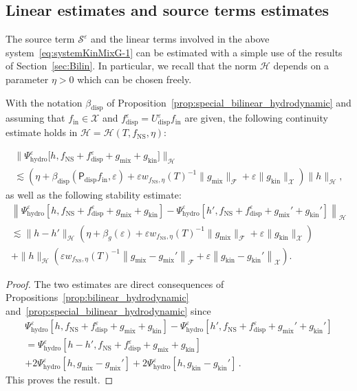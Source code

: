 \documentclass[10pt]{amsart}
\theoremstyle{definition}\newtheorem{defi}[theo]{Definition}\newtheorem{rema}[theo]{Remark}\newtheorem{exam}[theo]{Example}\newtheorem{exem}[theo]{Example}\newtheorem{nota}[theo]{Notation}
\newcommand{\ini}{\mathrm{in}}
\newcommand{\ns}{\mathrm{NS}}
\newcommand{\hyd}{\mathrm{hydro}}
\newcommand{\mix}{\mathrm{mix}}
\newcommand{\kin}{\mathrm{kin}}
\newcommand{\disp}{\mathrm{disp}}
\newcommand{\XX}{\mathcal{X}}
\newcommand{\PP}{\mathsf{P}}
\renewcommand{\SS}{\mathcal{S}}
\newcommand{\FFF}{\mathscr{F}}
\newcommand{\HHH}{\mathscr{H}}
\newcommand{\GGG}{\mathscr{X}}
\newcommand{\SSSs}{\HHH}
\newcommand{\SSl}{\XX}
\newcommand{\SSSl}{\GGG}
\newcommand{\SSSm}{\FFF}
\newcommand*\eps{{\varepsilon}}
\begin{document}
\subsection{Linear estimates and source terms estimates} 

The source term $\SS^\eps$ and the linear terms involved in the above system~\eqref{eq:systemKinMixG-1} can be estimated with a simple use of the results of Section~\ref{sec:Bilin}. In particular, we recall that the norm $\SSSs$ depends on a parameter $\eta >0$ which can be chosen freely.


\begin{prop}\label{prop:linear_hydrodynamic}
With the notation ${\beta_{\disp}}$ of Proposition~\ref{prop:special_bilinear_hydrodynamic} and assuming that $f_\ini \in \SSl$ and $f^\eps_\disp = U^\eps_\disp f_\ini$ are given, the following continuity estimate holds in $\SSSs=\SSSs(T, f_\ns, \eta)$:

\break
\begin{multline*}
\big\| \Psi^\eps_\hyd\big[h,  f_\ns + f^\eps_\disp + g_\mix + g_\kin\big] \big\|_{ \SSSs } \\
 \lesssim \left(\eta + {\beta_{\disp}}\left(\PP_\disp f_\ini, \eps\right) + \eps w_{f_\ns, \eta}(T)^{-1} \| g_\mix \|_{\SSSm} + \eps \| g_\kin \|_\SSSl\right) \| h \|_\SSSs,
\end{multline*}
as well as the following stability estimate:
\begin{multline*}
\left\| \Psi^\eps_\hyd\left[h, f_\ns  + f^\eps_\disp + g _\mix + g _\kin\right] - \Psi^\eps_\hyd\left[h', f_\ns + f^\eps_\disp + g_\mix '+ g_\kin'\right] \right\|_\SSSs \\
\lesssim \| h - h' \|_\SSSs \left(\eta + \beta_{g}(\eps) + \eps w_{f_\ns, \eta}(T)^{-1} \| g_\mix \|_{\SSSm} + \eps \| g_\kin \|_\SSSl \right) \\
 + \| h \|_\SSSs \left(\eps w_{f_\ns, \eta}(T)^{-1} \left\| g_\mix - g_\mix' \right\|_\SSSm + \eps \left\| g_\kin - g_\kin' \right\|_\SSSl \right).
\end{multline*}
\end{prop}

\begin{proof}
The two estimates are direct consequences of Propositions~\ref{prop:bilinear_hydrodynamic} and~\ref{prop:special_bilinear_hydrodynamic} since
\begin{multline*}
\Psi^\eps_\hyd\left[h, f_\ns + f^\eps_\disp + g _\mix + g _\kin\right] - \Psi^\eps_\hyd\left[h', f_\ns + f^\eps_\disp + g_\mix '+ g_\kin'\right]\\
=  \Psi^\eps_\hyd\left[h- h', f_\ns + f^\eps_\disp + g_\mix + g_\kin\right] \\
 + 2 \Psi^\eps_\hyd\left[h, g_\mix-g_\mix'\right] + 2 \Psi^\eps_\hyd\left[h, g_\kin-g_\kin'\right]\,.
\end{multline*}
This proves the result.
\end{proof}
\end{document}
